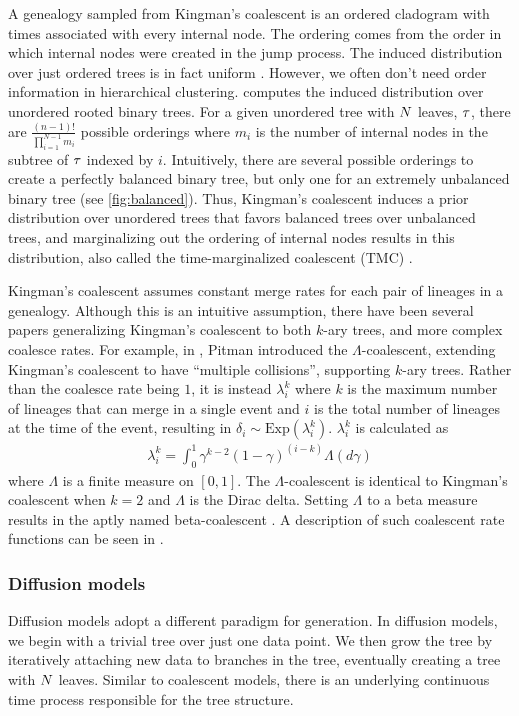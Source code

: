 A genealogy sampled from Kingman's coalescent
is an ordered cladogram with times associated with every internal node.
The ordering comes from the order in which
internal nodes were created in the jump process.
The induced distribution over just ordered trees
is in fact uniform \citep{Teh2008}.
However, we often don't need order information
in hierarchical clustering.
\citet{Boyles2012} computes the induced distribution over
unordered rooted binary trees.
For a given unordered tree with $N$ leaves, $\tau$,
there are $\frac{(n - 1)!}{\prod_{i = 1}^{N - 1}m_i}$ possible orderings
where $m_i$ is the number of internal nodes in the subtree
of $\tau$ indexed by $i$. 
Intuitively, there
are several possible orderings to create a perfectly balanced binary tree,
but only one for an extremely unbalanced binary tree (see \autoref{fig:balanced}).
Thus, Kingman's coalescent induces a prior distribution
over unordered trees
that favors balanced trees over unbalanced trees,
and 
marginalizing out the ordering of internal
nodes results in this distribution, also called
the time-marginalized coalescent (TMC) \citep{Boyles2012}.

Kingman's coalescent assumes constant merge rates
for each pair of lineages in a genealogy. 
Although this is an intuitive assumption,
there have been several papers generalizing Kingman's coalescent
to both $k$-ary trees, and more complex coalesce rates.
For example, in \citet{Pitman1999}, Pitman introduced the
$\Lambda$-coalescent, extending Kingman's coalescent
to have ``multiple collisions'', supporting
$k$-ary trees.
Rather than the coalesce rate
being $1$, it is instead $\lambda_i^k$
where $k$ is the maximum number of lineages
that can merge in a single event and $i$ is the total number
of lineages at the time of the event, resulting in $\delta_i \sim \text{Exp}(\lambda_i^k)$. $\lambda_i^k$ is calculated as
\begin{align}
  \lambda_i^k = \int_0^1 \gamma^{k - 2}(1 - \gamma)^{(i-k)}\Lambda(d\gamma)
\end{align}
where $\Lambda$ is a finite measure on $[0, 1]$. The
$\Lambda$-coalescent is identical to Kingman's coalescent
when $k = 2$ and $\Lambda$ is the Dirac delta.
Setting $\Lambda$ to a beta measure
results in the aptly named beta-coalescent \citep{Hu2013}.
A description of such coalescent rate functions
can be seen in \citet{Aldous1999}.

\subsubsection*{Diffusion models}
Diffusion models adopt a different paradigm for generation.
In diffusion models, we begin with a
trivial tree over just one data point. We then
grow the tree by iteratively attaching new data
to branches in the tree, eventually creating
a tree with $N$ leaves.
Similar to coalescent models, there is an underlying
continuous time process responsible for
the tree structure.

